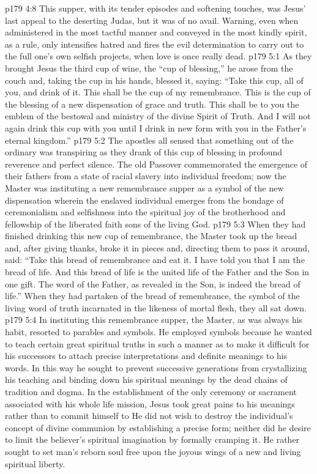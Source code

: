 \vs p179 4:8 This supper, with its tender episodes and softening touches, was Jesus’ last appeal to the deserting Judas, but it was of no avail. Warning, even when administered in the most tactful manner and conveyed in the most kindly spirit, as a rule, only intensifies hatred and fires the evil determination to carry out to the full one’s own selfish projects, when love is once really dead.
\vs p179 5:1 As they brought Jesus the third cup of wine, the “cup of blessing,” he arose from the couch and, taking the cup in his hands, blessed it, saying: \textcolor{ubdarkred}{“Take this cup, all of you, and drink of it. This shall be the cup of my remembrance. This is the cup of the blessing of a new dispensation of grace and truth. This shall be to you the emblem of the bestowal and ministry of the divine Spirit of Truth. And I will not again drink this cup with you until I drink in new form with you in the Father’s eternal kingdom.”}
\vs p179 5:2 The apostles all sensed that something out of the ordinary was transpiring as they drank of this cup of blessing in profound reverence and perfect silence. The old Passover commemorated the emergence of their fathers from a state of racial slavery into individual freedom; now the Master was instituting a new remembrance supper as a symbol of the new dispensation wherein the enslaved individual emerges from the bondage of ceremonialism and selfishness into the spiritual joy of the brotherhood and fellowship of the liberated faith sons of the living God.
\vs p179 5:3 When they had finished drinking this new cup of remembrance, the Master took up the bread and, after giving thanks, broke it in pieces and, directing them to pass it around, said: \textcolor{ubdarkred}{“Take this bread of remembrance and eat it. I have told you that I am the bread of life. And this bread of life is the united life of the Father and the Son in one gift. The word of the Father, as revealed in the Son, is indeed the bread of life.”} When they had partaken of the bread of remembrance, the symbol of the living word of truth incarnated in the likeness of mortal flesh, they all sat down.
\pc \vs p179 5:4 In instituting this remembrance supper, the Master, as was always his habit, resorted to parables and symbols. He employed symbols because he wanted to teach certain great spiritual truths in such a manner as to make it difficult for his successors to attach precise interpretations and definite meanings to his words. In this way he sought to prevent successive generations from crystallizing his teaching and binding down his spiritual meanings by the dead chains of tradition and dogma. In the establishment of the only ceremony or sacrament associated with his whole life mission, Jesus took great pains to  his meanings rather than to commit himself to  He did not wish to destroy the individual’s concept of divine communion by establishing a precise form; neither did he desire to limit the believer’s spiritual imagination by formally cramping it. He rather sought to set man’s reborn soul free upon the joyous wings of a new and living spiritual liberty.
